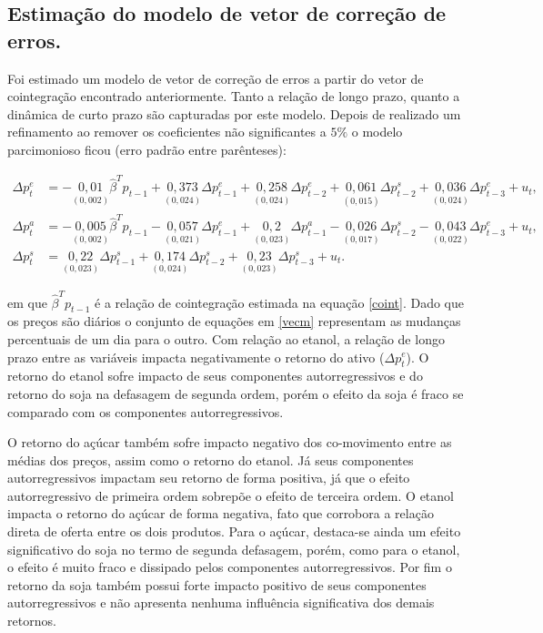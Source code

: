 \subsection{Estimação do modelo de vetor de correção de
erros.}\label{estimacao-do-modelo-de-vetor-de-correcao-de-erros.}

Foi estimado um modelo de vetor de correção de erros a partir do vetor
de cointegração encontrado anteriormente. Tanto a relação de longo prazo,
quanto a dinâmica de curto prazo são capturadas por este modelo. Depois
de realizado um refinamento ao remover os coeficientes não significantes
a \(5\%\) o modelo parcimonioso ficou (erro padrão entre parênteses):

\begin{align}\label{vecm}
\Delta p_t^e &=-\underset{(0,002)}{0,01}\hat{\beta}^Tp_{t-1}+\underset{(0,024)}{0,373}\Delta p_{t-1}^e+\underset{(0,024)}{0,258}\Delta p_{t-2}^e+\underset{(0,015)}{0,061}\Delta p^s_{t-2}+\underset{(0,024)}{0,036}\Delta p^e_{t-3}+u_t,\nonumber\\
\Delta p_t^a &=-\underset{(0,002)}{0,005}\hat{\beta}^Tp_{t-1}-\underset{(0,021)}{0,057}\Delta p^e_{t-1}+\underset{(0,023)}{0,2}\Delta p^a_{t-1}-\underset{(0,017)}{0,026}\Delta p_{t-2}^s-\underset{(0,022)}{0,043}\Delta p_{t-3}^e+u_t,\\
\Delta p_t^s &=\underset{(0,023)}{0,22}\Delta p_{t-1}^s+\underset{(0,024)}{0,174}\Delta p_{t-2}^s+\underset{(0,023)}{0,23}\Delta p_{t-3}^s+u_t.\nonumber
\end{align}

em que \(\hat{\beta}^Tp_{t-1}\) é a relação de cointegração estimada na
equação \eqref{coint}. Dado que os preços são diários o conjunto de
equações em \eqref{vecm} representam as mudanças percentuais de um dia
para o outro. Com relação ao etanol, a relação de longo prazo entre as
variáveis impacta negativamente o retorno do ativo (\(\Delta p_t^e\)). O
retorno do etanol sofre impacto de seus componentes autorregressivos e
do retorno do soja na defasagem de segunda ordem, porém o efeito da soja é fraco
se comparado com os componentes autorregressivos.

O retorno do açúcar também sofre impacto negativo dos co-movimento entre
as médias dos preços, assim como o retorno do etanol. Já seus
componentes autorregressivos impactam seu retorno de forma positiva, já
que o efeito autorregressivo de primeira ordem sobrepõe o efeito de
terceira ordem. O etanol impacta o retorno do açúcar de forma negativa,
fato que corrobora a relação direta de oferta entre os dois produtos.
Para o açúcar, destaca-se ainda um efeito significativo do soja no termo
de segunda defasagem, porém, como para o etanol, o efeito é muito fraco
e dissipado pelos componentes autorregressivos. Por fim o retorno da
soja também possui forte impacto positivo de seus componentes
autorregressivos e não apresenta nenhuma influência significativa dos
demais retornos.

